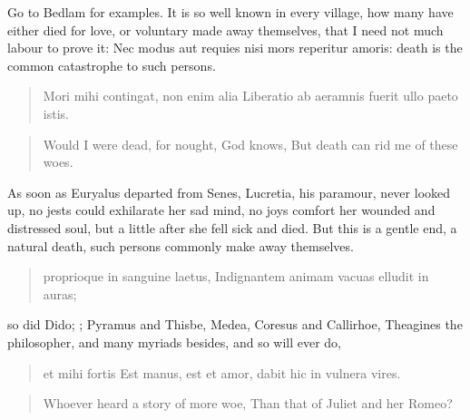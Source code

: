 Go to Bedlam for examples. It is so well known in every village, how
many have either died for love, or voluntary made away themselves, that
I need not much labour to prove it: Nec modus aut requies nisi
mors reperitur amoris: death is the common catastrophe to such persons.

\begin{latin}
\begin{verse}
Mori mihi contingat, non enim alia
Liberatio ab aeramnis fuerit ullo paeto istis.
\end{verse}
\end{latin}
\translationrule%
\begin{verse}%
Would I were dead, for nought, God knows,
But death can rid me of these woes.
\end{verse}%

As soon as Euryalus departed from Senes, Lucretia, his paramour, never
looked up, no jests could exhilarate her sad mind, no joys comfort her
wounded and distressed soul, but a little after she fell sick and died.
But this is a gentle end, a natural death, such persons commonly make
away themselves.

\begin{latin}
\begin{verse}
proprioque in sanguine laetus,
Indignantem animam vacuas elludit in auras;
\end{verse}
\end{latin}

so did Dido; ; 
Pyramus and Thisbe, Medea, Coresus and Callirhoe, Theagines
the philosopher, and many myriads besides, and so will ever do,

\begin{latin}
\begin{verse}
et mihi fortis
Est manus, est et amor, dabit hic in vulnera vires.
\end{verse}
\end{latin}
\translationrule%
\begin{verse}%
Whoever heard a story of more woe,
Than that of Juliet and her Romeo?
\end{verse}%

